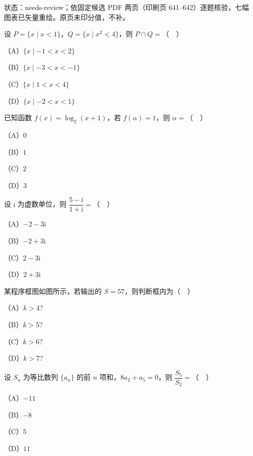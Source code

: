 状态：needs-review；依固定候选 PDF 两页（印刷页 641–642）逐题核验，七幅图表已矢量重绘。原页未印分值，不补。
\begin{question}
设 $P=\{x\mid x<1\}$，$Q=\{x\mid x^2<4\}$，则 $P\cap Q=$（　）

（A）$\{x\mid -1<x<2\}$

（B）$\{x\mid -3<x<-1\}$

（C）$\{x\mid 1<x<4\}$

（D）$\{x\mid -2<x<1\}$

\end{question}
\begin{question}
已知函数 $f(x)=\log_2(x+1)$，若 $f(\alpha)=1$，则 $\alpha=$（　）

（A）$0$

（B）$1$

（C）$2$

（D）$3$

\end{question}
\begin{question}
设 $\mathrm i$ 为虚数单位，则 $\dfrac{5-\mathrm i}{1+\mathrm i}=$（　）

（A）$-2-3\mathrm i$

（B）$-2+3\mathrm i$

（C）$2-3\mathrm i$

（D）$2+3\mathrm i$

\Needspace{0.4\textheight}
\end{question}
\begingroup
\renewenvironment{question}{\Needspace{0.5\textheight}}{}
\begin{question}
某程序框图如图所示，若输出的 $S=57$，则判断框内为（　）

（A）$k>4$?

（B）$k>5$?

（C）$k>6$?

（D）$k>7$?
\nopagebreak[4]
\begin{center}\end{center}
\nopagebreak[4]
\end{question}
\endgroup
\begin{question}
设 $S_n$ 为等比数列 $\{a_n\}$ 的前 $n$ 项和，$8a_2+a_5=0$，则 $\dfrac{S_5}{S_2}=$（　）

（A）$-11$

（B）$-8$

（C）$5$

（D）$11$

\end{question}

